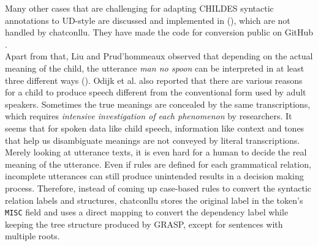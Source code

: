 Many other cases that are challenging for adapting CHILDES syntactic annotations to UD-style are discussed and implemented in (\cite{liu2021}), which are not handled by chatconllu. They have made the code for conversion public on GitHub .\\

Apart from that, Liu and Prud’hommeaux observed that depending on the actual meaning of the child, the utterance \emph{man no spoon} can be interpreted in at least three different ways (\cite{liu2021}). Odijk et al. also reported that there are various reasons for a child to produce speech different from the conventional form used by adult speakers. Sometimes the true meanings are concealed by the same transcriptions, which requires \emph{intensive investigation of each phenomenon} by researchers. It seems that for spoken data like child speech, information like context and tones that help us disambiguate meanings are not conveyed by literal transcriptions. Merely looking at utterance texts, it is even hard for a human to decide the real meaning of the utterance. Even if rules are defined for each grammatical relation, incomplete utterances can still produce unintended results in a decision making process. Therefore, instead of coming up case-based rules to convert the syntactic relation labels and structures, chatconllu stores the original label in the token's \texttt{MISC} field and uses a direct mapping to convert the dependency label while keeping the tree structure produced by GRASP, except for sentences with multiple roots.


